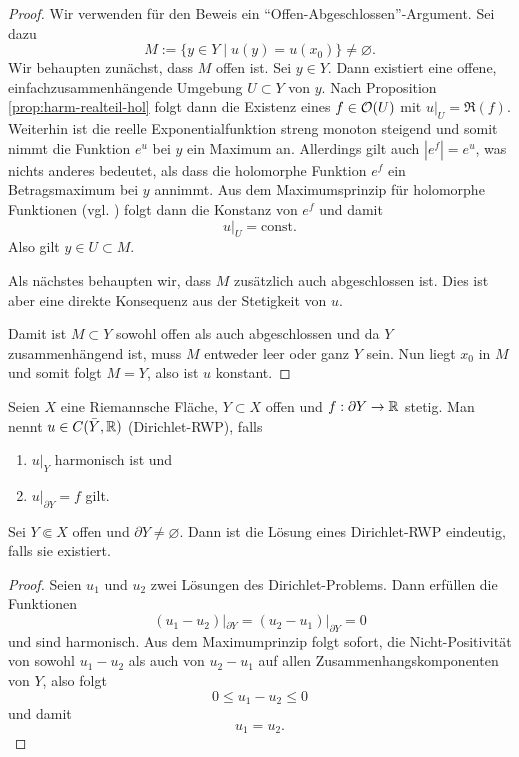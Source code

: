 \begin{proof}
  Wir verwenden für den Beweis ein
  "`Offen-Abgeschlossen"'-Argument. Sei dazu
  \[
  M:= \{ y \in Y\mid u(y) = u(x_0)\} \neq \varnothing.
  \]
  Wir behaupten zunächst, dass $M$ offen ist.
  Sei $y \in Y$. Dann existiert eine offene,
  einfachzusammenhängende Umgebung $U \subset Y$ von $y$. 
  Nach Proposition \ref{prop:harm-realteil-hol} folgt dann die
  Existenz eines $f \in \mathcal{O}(U)$ mit $u|_U = \Re(f)$.
  Weiterhin ist die reelle Exponentialfunktion streng monoton
  steigend und somit nimmt die Funktion $e^u$ bei $y$ ein Maximum
  an. Allerdings gilt auch $|e^f| = e^u$, was nichts anderes
  bedeutet, als dass die holomorphe Funktion $e^f$ ein
  Betragsmaximum bei $y$ annimmt. 
  Aus dem Maximumsprinzip für holomorphe Funktionen (vgl. \cite[Kor. 2.6]{For}) folgt dann die
  Konstanz von $e^f$ und damit
  \[
  u|_U = \text{const.}
  \]
  Also gilt $y \in U \subset M$.
  
  Als nächstes behaupten wir, dass $M$ zusätzlich auch abgeschlossen
  ist. Dies ist aber eine direkte Konsequenz aus der Stetigkeit von $u$.

  Damit ist $M \subset Y$ sowohl offen als auch abgeschlossen und da
  $Y$ zusammenhängend ist, muss $M$ entweder leer oder ganz $Y$
  sein. Nun liegt $x_0$ in $M$ und somit folgt $M = Y$, also ist $u$ konstant.
\end{proof}

\begin{defin}
  \label{defin:rwp}
  Seien $X$ eine Riemannsche Fläche, $Y\subset X$ offen und $f: \partial
  Y \rightarrow \mathbb{R}$ stetig. Man nennt $u \in C(\bar Y, \mathbb{R})$  (Dirichlet-RWP), falls
  \begin{enumerate}
  \item $u|_Y$ harmonisch ist und
  \item $u|_{\partial Y} = f$ gilt.
  \end{enumerate}
\end{defin}

\begin{prop}
  \label{prop:dirichlet-eindeutig}
  Sei $Y \Subset X$ offen und $\partial Y \neq \varnothing$. Dann ist
  die Lösung eines Dirichlet-RWP eindeutig, falls sie existiert.
\end{prop}

\begin{proof}
  Seien $u_1$ und $u_2$ zwei Lösungen des Dirichlet-Problems. Dann erfüllen
  die Funktionen
  \[
  (u_1 - u_2)|_{\partial Y} = (u_2 - u_1)|_{\partial Y} = 0
  \]
  und sind harmonisch. Aus dem Maximumprinzip folgt sofort, die
  Nicht-Positivität von sowohl $u_1 - u_2$ als auch von $u_2 - u_1$
  auf allen Zusammenhangskomponenten von $Y$, also folgt
  \[
  0 \leq u_1 - u_2 \leq 0
  \]
  und damit
  \[
  u_1 = u_2.
  \]
\end{proof}

